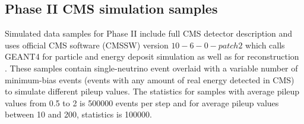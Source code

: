 \subsection{Phase II CMS simulation samples}

 Simulated data samples for Phase II include full CMS detector description and uses official CMS software (CMSSW) version $10-6-0-patch2$ which calls GEANT4 for particle and energy deposit simulation as well as for reconstruction \cite{Agostinelli:2002hh}. These samples contain single-neutrino event overlaid with a variable number of minimum-bias events (events with any amount of real energy detected in CMS) to simulate different pileup values. The statistics for samples with average pileup values from 0.5 to 2 is 500000 events per step and for average pileup values between 10 and 200, statistics is 100000. 

